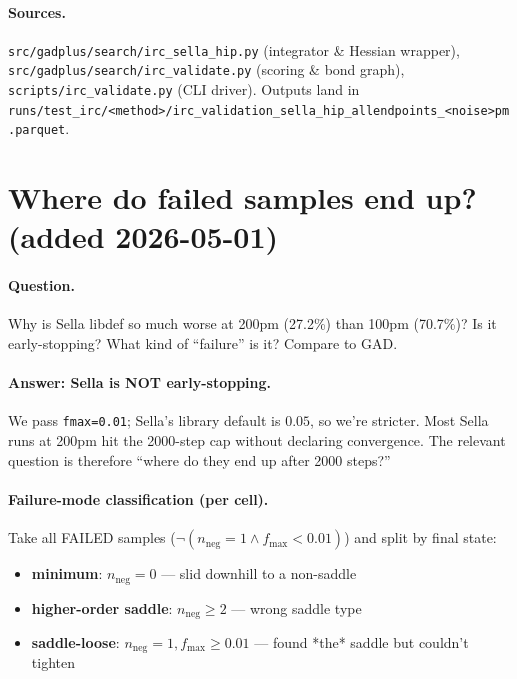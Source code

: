 \documentclass[11pt]{article}
\begin{document}
\paragraph{Sources.}
\texttt{src/gadplus/search/irc\_sella\_hip.py} (integrator \& Hessian wrapper),
\texttt{src/gadplus/search/irc\_validate.py} (scoring \& bond graph),
\texttt{scripts/irc\_validate.py} (CLI driver).
Outputs land in \texttt{runs/test\_irc/<method>/irc\_validation\_sella\_hip\_allendpoints\_<noise>pm.parquet}.

\section{Where do failed samples end up? (added 2026-05-01)}

\paragraph{Question.} Why is Sella libdef so much worse at 200pm
(27.2\%) than 100pm (70.7\%)? Is it early-stopping? What kind of
``failure'' is it? Compare to GAD.

\paragraph{Answer: Sella is NOT early-stopping.} We pass
\texttt{fmax=0.01}; Sella's library default is $0.05$, so we're stricter.
Most Sella runs at 200pm hit the 2000-step cap without declaring
convergence. The relevant question is therefore ``where do they end
up after 2000 steps?''

\paragraph{Failure-mode classification (per cell).} Take all FAILED
samples ($\neg(n_{\text{neg}}=1 \wedge f_{\max}<0.01)$) and split by
final state:
\begin{itemize}[leftmargin=1.5em]
\item \textbf{minimum}: $n_{\text{neg}}=0$ — slid downhill to a non-saddle
\item \textbf{higher-order saddle}: $n_{\text{neg}} \ge 2$ — wrong saddle type
\item \textbf{saddle-loose}: $n_{\text{neg}}=1, f_{\max}\ge 0.01$ — found *the* saddle but couldn't tighten
\end{itemize}
\end{document}

